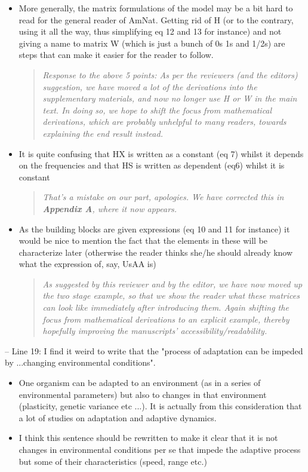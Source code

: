 \documentclass[11pt]{article}
\begin{document}
\begin{itemize}
	\item More generally, the matrix formulations of the model may be a bit hard to read for the general reader of AmNat. Getting rid of H (or to the contrary, using it all the way, thus simplifying eq 12 and 13 for instance) and not giving a name to matrix W (which is just a bunch of 0s 1s and 1/2s) are steps that can make it easier for the reader to follow.
\begin{quote}
	{\itshape Response to the above 5 points: As per the reviewers (and the editors) suggestion, we have moved a lot of the derivations into the supplementary materials, and now no longer use H or W in the main text. In doing so, we hope to shift the focus from mathematical derivations, which are probably unhelpful to many readers, towards explaining the end result instead. }
\end{quote}

	\item It is quite confusing that HX is written as a constant (eq 7) whilst it depends on the frequencies and that HS is written as dependent (eq6) whilst it is constant
	\begin{quote}
	{\itshape That's a mistake on our part, apologies. We have corrected this in {\bf Appendix A}, where it now appears.}
\end{quote}
	\item As the building blocks are given expressions (eq 10 and 11 for instance) it would be nice to mention the fact that the elements in these will be characterize later (otherwise the reader thinks she/he should already know what the expression of, say, UsAA is)
\begin{quote}
	{\itshape As suggested by this reviewer and by the editor, we have now moved up the two stage example, so that we show the reader what these matrices can look like immediately after introducing them. Again shifting the focus from mathematical derivations to an explicit example, thereby hopefully improving the manuscripts' accessibility/readability.  }
\end{quote}

\end{itemize}

\noindent -- Line 19: I find it weird to write that the "process of adaptation can be impeded by ...changing environmental conditions".

\begin{itemize}
	\item One organism can be adapted to an environment (as in a series of environmental parameters) but also to changes in that environment (plasticity, genetic variance etc ...). It is actually from this consideration that a lot of studies on adaptation and adaptive dynamics.
	\item I think this sentence should be rewritten to make it clear that it is not changes in environmental conditions per se that impede the adaptive process but some of their characteristics (speed, range etc.)
\end{itemize}
\end{document}

